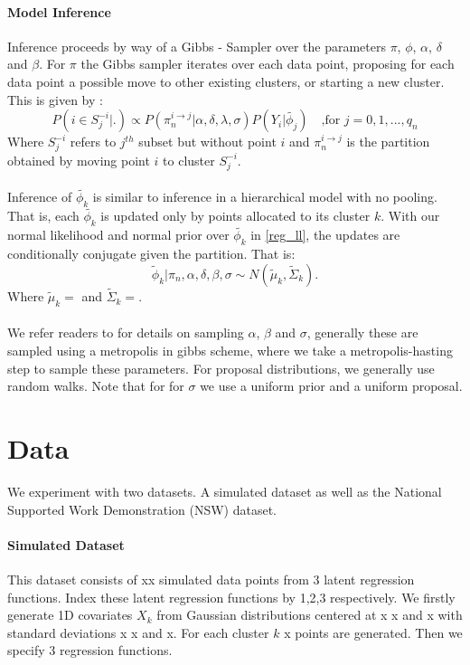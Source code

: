 \documentclass{article}
\begin{document}
\paragraph{Model Inference} 
Inference proceeds by way of a Gibbs - Sampler over the parameters $\pi$, $\phi$, $\alpha$, $\delta$ and $\beta$. For $\pi$ the Gibbs sampler iterates over each data point, proposing for each data point a possible move to other existing clusters, or starting a new cluster. This is given by :
\begin{equation}
    P(i \in S_j^{-i} |.) \propto P(\pi_n^{i \rightarrow j} | \alpha, \delta, \lambda, \sigma)P(Y_i | \tilde{\phi_j})  \quad \text{,for } j=0,1,...,q_n
\end{equation}
Where $S_j^{-i}$ refers to $j^{th}$ subset but without point $i$ and $\pi_n^{i \rightarrow j}$ is the partition obtained by moving point $i$ to cluster $S_j^{-i}$.
\\ \\
Inference of $\tilde{\phi_k}$ is similar to inference in a hierarchical model with no pooling. That is, each $\tilde{\phi_k}$ is updated only by points allocated to its cluster $k$. With our normal likelihood and normal prior over $\tilde{\phi_k}$ in \ref{reg_ll}, the updates are conditionally conjugate given the partition. That is:
\begin{equation}
    \tilde{\phi}_k | \pi_n, \alpha, \delta, \beta, \sigma \sim N(\tilde{\mu}_k, \tilde{\Sigma}_k). 
\end{equation}
Where $\tilde{\mu}_k = $ and $\tilde{\Sigma}_k=$.
\\ \\ 
We refer readers to \cite{dahl2017random} for details on sampling $\alpha$, $\beta$ and $\sigma$, generally these are sampled using a metropolis in gibbs scheme, where we take a metropolis-hasting step to sample these parameters. For proposal distributions, we generally use random walks. Note that for for $\sigma$ we use a uniform prior and a uniform proposal. 
\section{Data}
We experiment with two datasets. A simulated dataset as well as the National Supported Work Demonstration (NSW) dataset.

\paragraph{Simulated Dataset} This dataset consists of xx simulated data points from 3 latent regression functions. Index these latent regression functions by 1,2,3 respectively. We firstly generate 1D covariates $X_k$ from Gaussian distributions centered at x x and x with standard deviations x x and x. For each cluster $k$ x points are generated. Then we specify 3 regression functions.
\end{document}
